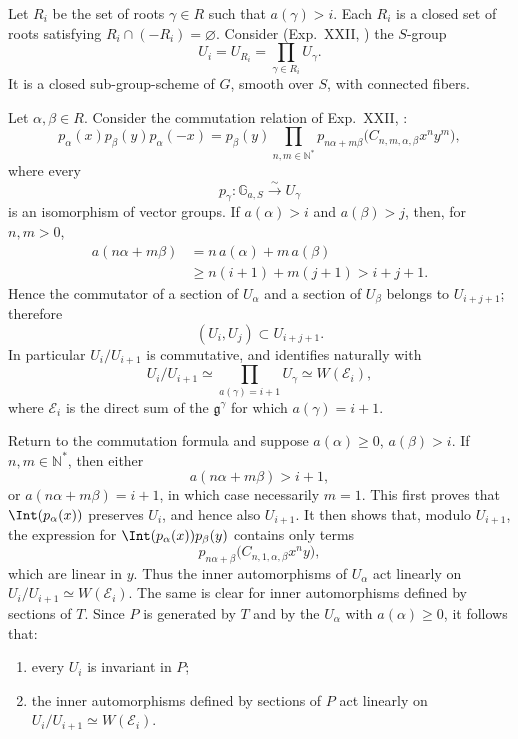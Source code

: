 Let \(R_i\) be the set of roots \(\gamma\in R\) such that
\(a(\gamma)>i\).  Each \(R_i\) is a closed set of roots satisfying
\(R_i\cap(-R_i)=\varnothing\).  Consider (Exp.\ XXII, ) the
\(S\)-group
\[
 U_i=U_{R_i}=\prod_{\gamma\in R_i}U_\gamma.
\]
It is a closed sub-group-scheme of \(G\), smooth over \(S\), with connected
fibers.

Let \(\alpha,\beta\in R\).  Consider the commutation relation of
Exp.\ XXII, :
\[
 p_\alpha(x)p_\beta(y)p_\alpha(-x)
 =
 p_\beta(y)
 \prod_{n,m\in\mathbb N^*}
 p_{n\alpha+m\beta}
 \bigl(C_{n,m,\alpha,\beta}x^ny^m\bigr),
\]
where every
\[
 p_\gamma:\mathbb G_{a,S}\xrightarrow{\sim}U_\gamma
\]
is an isomorphism of vector groups.  If \(a(\alpha)>i\) and
\(a(\beta)>j\), then, for \(n,m>0\),
\[
\begin{aligned}
 a(n\alpha+m\beta)
 &=n\,a(\alpha)+m\,a(\beta)\\
 &\geq n(i+1)+m(j+1)>i+j+1.
\end{aligned}
\]
Hence the commutator of a section of \(U_\alpha\) and a section of
\(U_\beta\) belongs to \(U_{i+j+1}\); therefore
\[
 (U_i,U_j)\subset U_{i+j+1}.
\]
In particular \(U_i/U_{i+1}\) is commutative, and identifies naturally
with
\[
 U_i/U_{i+1}
 \simeq
 \prod_{a(\gamma)=i+1}U_\gamma
 \simeq W(\mathcal E_i),
\]
where \(\mathcal E_i\) is the direct sum of the
\(\mathfrak g^\gamma\) for which \(a(\gamma)=i+1\).

Return to the commutation formula and suppose
\(a(\alpha)\geq0\), \(a(\beta)>i\).  If \(n,m\in\mathbb N^*\), then
either
\[
 a(n\alpha+m\beta)>i+1,
\]
or \(a(n\alpha+m\beta)=i+1\), in which case necessarily \(m=1\).
This first proves that \(\Int(p_\alpha(x))\) preserves \(U_i\), and hence
also \(U_{i+1}\).  It then shows that, modulo \(U_{i+1}\), the expression
for \(\Int(p_\alpha(x))p_\beta(y)\) contains only terms
\[
 p_{n\alpha+\beta}
 \bigl(C_{n,1,\alpha,\beta}x^ny\bigr),
\]
which are linear in \(y\).  Thus the inner automorphisms of \(U_\alpha\) act linearly on
\(U_i/U_{i+1}\simeq W(\mathcal E_i)\).  The same is clear for inner
automorphisms defined by sections of \(T\).  Since \(P\) is generated by
\(T\) and by the \(U_\alpha\) with \(a(\alpha)\geq0\), it follows that:
\begin{enumerate}[label=\textup{(\roman*)}]
\item every \(U_i\) is invariant in \(P\);
\item the inner automorphisms defined by sections of \(P\) act linearly on
\(U_i/U_{i+1}\simeq W(\mathcal E_i)\).
\end{enumerate}

